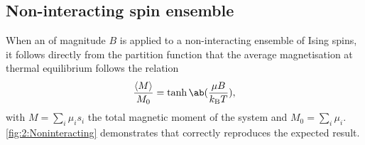 \subsection{Non-interacting spin ensemble}

When an  of magnitude $B$ is applied to a non-interacting ensemble of Ising spins, it follows directly from the partition function that the average magnetisation at thermal equilibrium follows the relation
\begin{equation}
	\frac{\langle M \rangle}{M_0} = \tanh\ab(\frac{\mu B}{\kBT}) \mathrm{,}
\end{equation}
with $M = \sum_i \mu_i s_i$ the total magnetic moment of the system and $M_0 = \sum_i \mu_i$.
\cref{fig:2:Noninteracting} demonstrates that \hotspice{} correctly reproduces the expected result.


